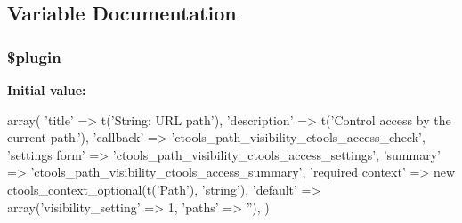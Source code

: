 \subsection{Variable Documentation}
\hypertarget{path__visibility_8inc_ada8a7130088351710bb02ed622d6bf65}{
\subsubsection[{\$plugin}]{\setlength{\rightskip}{0pt plus 5cm}\$plugin}}
\label{path__visibility_8inc_ada8a7130088351710bb02ed622d6bf65}
{\bfseries Initial value:}
\begin{DoxyCode}
 array(
  'title' => t('String: URL path'),
  'description' => t('Control access by the current path.'),
  'callback' => 'ctools_path_visibility_ctools_access_check',
  'settings form' => 'ctools_path_visibility_ctools_access_settings',
  'summary' => 'ctools_path_visibility_ctools_access_summary',
  'required context' =>  new ctools_context_optional(t('Path'), 'string'),
  'default' => array('visibility_setting' => 1, 'paths' => ''),
)
\end{DoxyCode}
